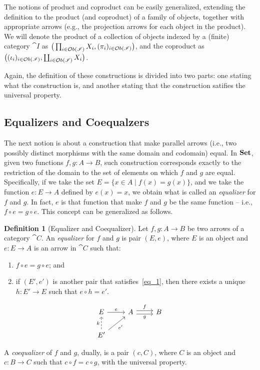 \documentclass[a4paper, twoside,openright]{report}
\theoremstyle{plain}
\theoremstyle{definition}
\newtheorem{definition}[theorem]{Definition}
\begin{document}
The notions of product and coproduct can be easily generalized, extending the definition to the product (and coproduct) of a family of objects, together with appropriate arrows (e.g., the projection arrows for each object in the product). We will denote the product of a collection of objects indexed by a (finite) category $\cat I$ as $\big(\prod_{i \in \mathcal{O}b(\mathscr{I})} X_i, (\pi_i)_{i \in \mathcal{O}b(\mathscr{I})}\big)$, and the coproduct as $\big((\iota_i)_{i \in \mathcal{O}b(\mathscr{I})}, \coprod_{i \in \mathcal{O}b(\mathscr{I})} X_i\big)$.

Again, the definition of these constructions is divided into two parts: one stating what the construction is, and another stating that the construction satifies the universal property.

\subsection{Equalizers and Coequalzers}

The next notion is about a construction that make parallel arrows (i.e., two possibly distinct morphisms with the same domain and codomain) equal. In $\mathbf{Set}$, given two functions $f, g: A \rightarrow B$, such construction corresponds exactly to the restriction of the domain to the set of elements on which $f$ and $g$ are equal. Specifically, if we take the set $E = \{x \in A \mid f(x) = g(x)\}$, and we take the function $e: E \rightarrow A$ defined by $e(x) = x$, we obtain what is called an \emph{equalizer} for $f$ and $g$. In fact, $e$ is that function that make $f$ and $g$ be the same function -- i.e., $f \circ e = g \circ e$.
This concept can be generalized as follows.

\begin{definition}[Equalizer and Coequalizer]
    Let $f, g: A \rightarrow B$ be two arrows of a category $\cat C$. An \emph{equalizer} for $f$ and $g$ is pair $(E, e)$, where $E$ is an object and $e: E \rightarrow A$ is an arrow in $\cat C$ such that:
    \begin{enumerate}
        \item \label{eq_1} $ f \circ e = g \circ e$; and
        \item if $(E', e')$ is another pair that satisfies~\ref{eq_1}, then there exists a unique $h: E' \rightarrow E$ such that $e \circ h = e'$.
    \end{enumerate}
    \[
        \begin{tikzcd}
            E \arrow[r, "e"] & A \arrow[r, shift left, "f"] \arrow[r, shift right, "g" swap] & B \\
            E' \arrow[u, dashed, "k"] \arrow[ur, "e'" swap] & 
        \end{tikzcd}
    \]

    A \emph{coequalizer} of $f$ and $g$, dually, is a pair $(c, C)$, where $C$ is an object and $c: B \rightarrow C$ such that $c \circ f = c \circ g$, with the universal property.
\end{definition}
\end{document}
